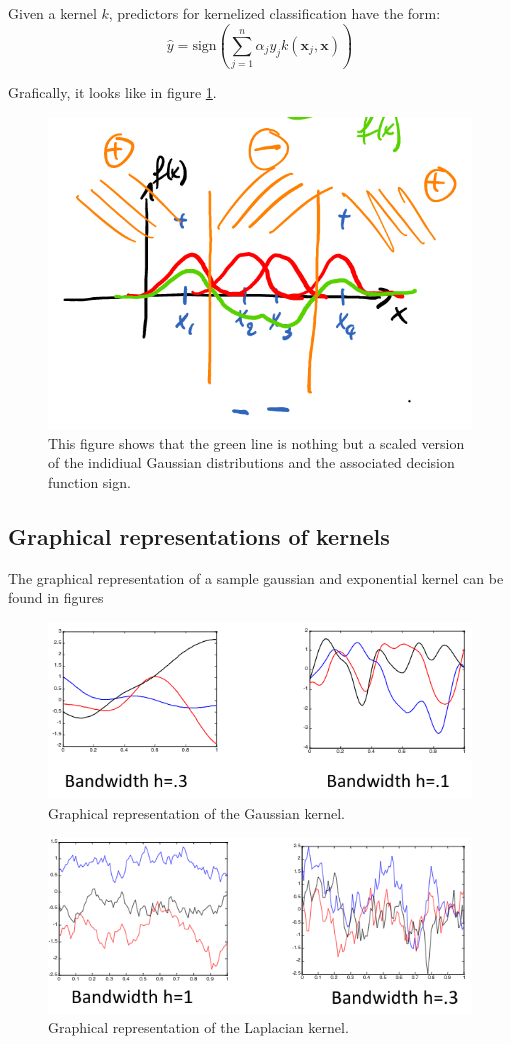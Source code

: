 \documentclass[a4paper,10pt,twoside]{article}
\begin{document}
Given a kernel $k$, predictors for kernelized classification have the form:
\begin{equation*}
    \hat{y} = \text{sign}(\sum_{j=1}^{n}\alpha_jy_jk(\mathbf{x}_j,\mathbf{x}))
\end{equation*}

Grafically, it looks like in figure \ref{decision_function_kernelized}.

\begin{figure}[htbp]
    \centering
    \includegraphics[width=.5\textwidth]{figures/decision_function_kernelized.png}
    \caption{This figure shows that the green line is nothing but a scaled version of the indidiual Gaussian distributions and the associated decision function sign.}
    \label{decision_function_kernelized}
\end{figure}

\subsection{Graphical representations of kernels}

The graphical representation of a sample gaussian and exponential kernel can be found in figures 

\begin{figure}[htbp]
    \centering
    \includegraphics[width=.5\textwidth]{figures/gaussian_kernel.png}
    \caption{Graphical representation of the Gaussian kernel.}
    \label{gaussian_kernel}
\end{figure}

\begin{figure}[htbp]
    \centering
    \includegraphics[width=.5\textwidth]{figures/laplacian_kernel.png}
    \caption{Graphical representation of the Laplacian kernel.}
    \label{laplacian_kernel}
\end{figure}
\end{document}
